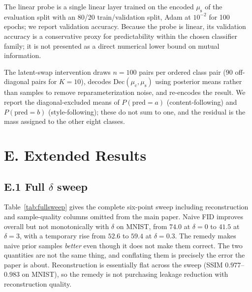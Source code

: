 \documentclass[letterpaper]{article} %
\newcommand{\muc}{\mu_{\mathrm{c}}}
\newcommand{\mus}{\mu_{\mathrm{s}}}
\begin{document}
The linear probe is a single linear layer trained on the encoded $\mus$ of
the evaluation split with an 80/20 train/validation split, Adam at $10^{-2}$
for 100 epochs; we report validation accuracy. Because the probe is linear,
its validation accuracy is a conservative proxy for predictability within
the chosen classifier family; it is not presented as a direct numerical
lower bound on mutual information.

The latent-swap intervention draws $n{=}100$ pairs per ordered class pair
($90$ off-diagonal pairs for $K{=}10$), decodes $\mathrm{Dec}(\muc,\mus)$
using posterior means rather than samples to remove reparameterization noise,
and re-encodes the result. We report the diagonal-excluded means of
$P(\mathrm{pred}{=}a)$ (content-following) and $P(\mathrm{pred}{=}b)$
(style-following); these do not sum to one, and the residual is the mass
assigned to the other eight classes.

\section{E. Extended Results}

\subsection{E.1 Full $\delta$ sweep}

Table~\ref{tab:fullsweep} gives the complete six-point sweep including
reconstruction and sample-quality columns omitted from the main paper.
Naive FID improves overall but not monotonically with $\delta$ on MNIST,
from $74.0$ at $\delta{=}0$ to $41.5$ at $\delta{=}3$, with a temporary rise
from $52.6$ to $59.4$ at $\delta{=}0.3$. The
remedy makes naive prior samples \emph{better} even though it does not make
them correct. The two quantities are not the same thing, and conflating them
is precisely the error the paper is about. Reconstruction is essentially
flat across the sweep (SSIM $0.977$--$0.983$ on MNIST), so the remedy is not
purchasing leakage reduction with reconstruction quality.
\end{document}
